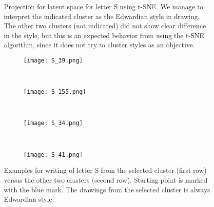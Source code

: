\documentclass[conference]{IEEEtran}
\begin{document}
\begin{figure}[htbp!]
\centering
{}
\caption{Projection for latent space for letter S using t-SNE. We manage to interpret the indicated cluster as the Edwardian style in drawing. The other two clusters (not indicated) did not show clear difference in the style, but this is an expected behavior from using the t-SNE algorithm, since it does not try to cluster styles as an objective.}
\label{fig:s_bottleneck}
\end{figure}


\begin{figure}[!htbp]
    \centering
    \begin{subfigure}{0.22\textwidth}
        \texttt{[image: S\_39.png]}
    \end{subfigure}
    ~
    \begin{subfigure}{0.22\textwidth}
        \texttt{[image: S\_155.png]}
    \end{subfigure}
    ~
    \begin{subfigure}{0.22\textwidth}
        \texttt{[image: S\_34.png]}
    \end{subfigure}
    ~
    \begin{subfigure}{0.22\textwidth}
        \texttt{[image: S\_41.png]}
    \end{subfigure}
    
    \caption{Examples for writing of letter S from the selected cluster (first row) versus the other two clusters (second row). Starting point is marked with the blue mark. The drawings from the selected cluster is always Edwardian style.}
    \label{fig:examples_s}
\end{figure}
\end{document}
